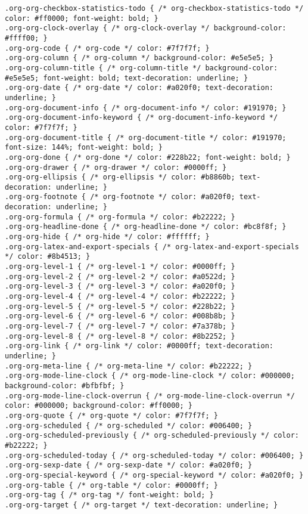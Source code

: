 \documentclass[11pt]{article}
\begin{document}
\begin{verbatim}
.org-org-checkbox-statistics-todo { /* org-checkbox-statistics-todo */ color: #ff0000; font-weight: bold; }
.org-org-clock-overlay { /* org-clock-overlay */ background-color: #ffff00; }
.org-org-code { /* org-code */ color: #7f7f7f; }
.org-org-column { /* org-column */ background-color: #e5e5e5; }
.org-org-column-title { /* org-column-title */ background-color: #e5e5e5; font-weight: bold; text-decoration: underline; }
.org-org-date { /* org-date */ color: #a020f0; text-decoration: underline; }
.org-org-document-info { /* org-document-info */ color: #191970; }
.org-org-document-info-keyword { /* org-document-info-keyword */ color: #7f7f7f; }
.org-org-document-title { /* org-document-title */ color: #191970; font-size: 144%; font-weight: bold; }
.org-org-done { /* org-done */ color: #228b22; font-weight: bold; }
.org-org-drawer { /* org-drawer */ color: #0000ff; }
.org-org-ellipsis { /* org-ellipsis */ color: #b8860b; text-decoration: underline; }
.org-org-footnote { /* org-footnote */ color: #a020f0; text-decoration: underline; }
.org-org-formula { /* org-formula */ color: #b22222; }
.org-org-headline-done { /* org-headline-done */ color: #bc8f8f; }
.org-org-hide { /* org-hide */ color: #ffffff; }
.org-org-latex-and-export-specials { /* org-latex-and-export-specials */ color: #8b4513; }
.org-org-level-1 { /* org-level-1 */ color: #0000ff; }
.org-org-level-2 { /* org-level-2 */ color: #a0522d; }
.org-org-level-3 { /* org-level-3 */ color: #a020f0; }
.org-org-level-4 { /* org-level-4 */ color: #b22222; }
.org-org-level-5 { /* org-level-5 */ color: #228b22; }
.org-org-level-6 { /* org-level-6 */ color: #008b8b; }
.org-org-level-7 { /* org-level-7 */ color: #7a378b; }
.org-org-level-8 { /* org-level-8 */ color: #8b2252; }
.org-org-link { /* org-link */ color: #0000ff; text-decoration: underline; }
.org-org-meta-line { /* org-meta-line */ color: #b22222; }
.org-org-mode-line-clock { /* org-mode-line-clock */ color: #000000; background-color: #bfbfbf; }
.org-org-mode-line-clock-overrun { /* org-mode-line-clock-overrun */ color: #000000; background-color: #ff0000; }
.org-org-quote { /* org-quote */ color: #7f7f7f; }
.org-org-scheduled { /* org-scheduled */ color: #006400; }
.org-org-scheduled-previously { /* org-scheduled-previously */ color: #b22222; }
.org-org-scheduled-today { /* org-scheduled-today */ color: #006400; }
.org-org-sexp-date { /* org-sexp-date */ color: #a020f0; }
.org-org-special-keyword { /* org-special-keyword */ color: #a020f0; }
.org-org-table { /* org-table */ color: #0000ff; }
.org-org-tag { /* org-tag */ font-weight: bold; }
.org-org-target { /* org-target */ text-decoration: underline; }

\end{verbatim}
\end{document}
